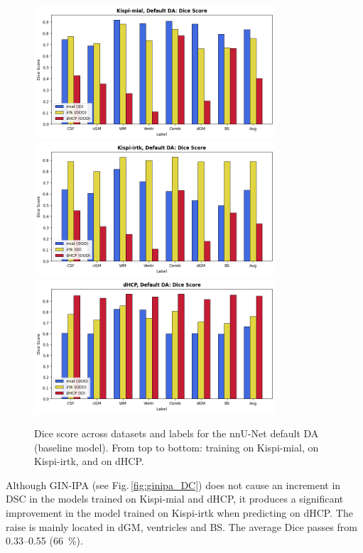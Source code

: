 \begin{figure}[htbp]
  \centering
  \includegraphics[width=0.8\textwidth]{figures/mial_default_DC.png} \\
  \vspace{10pt}
  \includegraphics[width=0.8\textwidth]{figures/irtk_default_DC.png} \\
  \vspace{10pt}
  \includegraphics[width=0.8\textwidth]{figures/dHCP_default_DC.png}
  \caption{Dice score across datasets and labels for the nnU-Net default DA (baseline model). From top to bottom: training on Kispi-mial, on Kispi-irtk, and on dHCP.}
  \label{fig:default_DC}
\end{figure}

Although GIN-IPA (see Fig.\,\ref{fig:ginipa_DC}) does not cause an increment in DSC in the models trained on Kispi-mial and dHCP, it produces a significant improvement in the model trained on Kispi-irtk when predicting on dHCP. The raise is mainly located in dGM, ventricles and BS. The average Dice passes from \numrange{0.33}{0.55} (\qty{+66}{\percent}).

